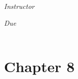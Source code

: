 \documentclass[12pt, oneside]{book}
\begin{document}
\begin{titlepage}
\begin{center}
\begin{large}
            \textit{Instructor} \\[1ex] %
            \professor

            \vspace*{1\baselineskip}

            \textit{Due}\\[1ex]
            {\scshape  \finaldate} \\[0.3\baselineskip] %

            \thispagestyle{empty}

        \end{large}
    \end{center}
\end{titlepage}


\section*{Chapter 8}

\end{document}
